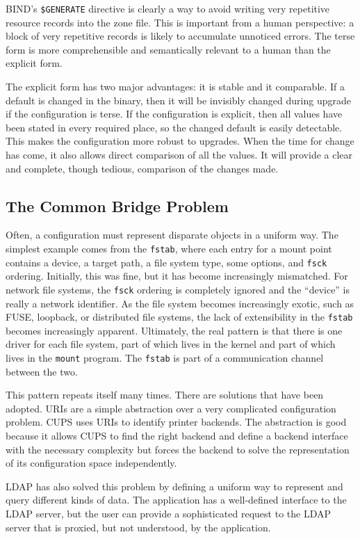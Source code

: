 \documentclass[letterpaper,twocolumn,10pt]{article}
\begin{document}
BIND's \texttt{\$GENERATE} directive is clearly a way to avoid writing very repetitive resource records into the zone file. This is important from a human perspective: a block of very repetitive records is likely to accumulate unnoticed errors. The terse form is more comprehensible and semantically relevant to a human than the explicit form.

The explicit form has two major advantages: it is stable and it comparable. If a default is changed in the binary, then it will be invisibly changed during upgrade if the configuration is terse. If the configuration is explicit, then all values have been stated in every required place, so the changed default is easily detectable. This makes the configuration more robust to upgrades. When the time for change has come, it also allows direct comparison of all the values. It will provide a clear and complete, though tedious, comparison of the changes made.

\subsection{The Common Bridge Problem}
Often, a configuration must represent disparate objects in a uniform way. The simplest example comes from the \texttt{fstab}, where each entry for a mount point contains a device, a target path, a file system type, some options, and \texttt{fsck} ordering.\cite{fstab} Initially, this was fine, but it has become increasingly mismatched. For network file systems, the \texttt{fsck} ordering is completely ignored and the ``device'' is really a network identifier. As the file system becomes increasingly exotic, such as FUSE, loopback, or distributed file systems, the lack of extensibility in the \texttt{fstab} becomes increasingly apparent. Ultimately, the real pattern is that there is one driver for each file system, part of which lives in the kernel and part of which lives in the \texttt{mount} program. The \texttt{fstab} is part of a communication channel between the two.

This pattern repeats itself many times. There are solutions that have been adopted. URIs are a simple abstraction over a very complicated configuration problem. CUPS uses URIs to identify printer backends. The abstraction is good because it allows CUPS to find the right backend and define a backend interface with the necessary complexity but forces the backend to solve the representation of its configuration space independently.

LDAP has also solved this problem by defining a uniform way to represent and query different kinds of data. The application has a well-defined interface to the LDAP server, but the user can provide a sophisticated request to the LDAP server that is proxied, but not understood, by the application.
\end{document}
